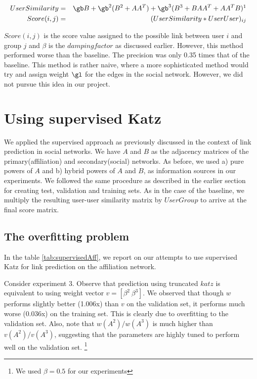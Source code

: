 \documentclass{report}
\begin{document}
\begin{eqnarray*}
UserSimilarity & = & \gb B + \gb^2(B^2 + AA^T) + \gb^3 (B^3 + BAA^T + A A^TB)\footnotemark\\
Score(i,j) & = & (UserSimilarity*UserUser)_{ij}
\end{eqnarray*}


$Score(i,j)$ is the score value assigned to the possible link between user $i$ and group $j$ and $\beta$ is the $damping factor$ as discussed earlier. However, this method performed worse than the baseline. The precision was only 0.35 times that of the baseline. This method is rather naive, where a more sophisticated method would try and assign weight $\gl$ for the edges in the social network. However, we did not pursue this idea in our project.

\section{Using supervised Katz}
We applied the supervised approach as previously discussed in the context of link prediction in social networks. We have $A$ and $B$ as the adjacency matrices of the primary(affiliation) and secondary(social) networks. As before, we used a) pure powers of $A$ and b) hybrid powers of $A$ and $B$, as information sources in our experiments. We followed the same procedure as described in the earlier section for creating test, validation and training sets. As in the case of the baseline, we multiply the resulting user-user similarity matrix by $UserGroup$ to arrive at the final score matrix. 

\subsection{The overfitting problem}
In the table \ref{tab:supervisedAff}, we report on our attempts to use supervised Katz for link prediction on the affiliation network.

Consider experiment 3. Observe that prediction using truncated $katz$ is equivalent to using weight vector $v = [\beta^2 \ \beta^3]$. We observed that though $w$ performs slightly better (1.006x) than $v$ on the validation set, it performs much worse (0.036x) on the training set. This is clearly due to overfitting to the validation set. Also, note that $w(A^2)/w(A^3)$ is much higher than $v(A^2)/v(A^3)$, suggesting that the parameters are highly tuned to perform well on the validation set. \footnote{We used $\beta = 0.5$ for our experiments}
\end{document}
